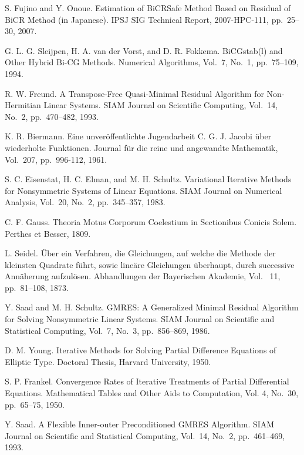 \documentclass[a4paper]{article}
\begin{document}
\begin{thebibliography}{10}
S. Fujino and Y. Onoue.
\newblock Estimation of BiCRSafe Method Based on Residual of BiCR Method (in Japanese).
\newblock IPSJ SIG Technical Report, 2007-HPC-111, pp.\ 25--30, 2007.

G. L. G. Sleijpen, H. A. van der Vorst, and D. R. Fokkema.
\newblock BiCGstab(l) and Other Hybrid Bi-CG Methods.
\newblock Numerical Algorithms, Vol.~7, No.~1, pp.\ 75--109, 1994.

R. W. Freund.
\newblock A Transpose-Free Quasi-Minimal Residual Algorithm for
	Non-Hermitian Linear Systems.
\newblock SIAM Journal on Scientific Computing, Vol.~14, No.~2, pp.\ 470--482, 1993.

K. R. Biermann.
\newblock Eine unver\"offentlichte Jugendarbeit C. G. J. Jacobi \"uber
	wiederholte Funktionen.
\newblock Journal f\"ur die reine und angewandte Mathematik, Vol.~207, pp.\ 996-112, 1961.

S. C. Eisenstat, H. C. Elman, and M. H. Schultz.
\newblock Variational Iterative Methods for Nonsymmetric Systems of
	Linear Equations.
\newblock SIAM Journal on Numerical Analysis, Vol.~20, No.~2, pp.\ 345--357, 1983.

C. F. Gauss.
\newblock Theoria Motus Corporum Coelestium in Sectionibus Conicis Solem. 
\newblock Perthes et Besser, 1809.

L. Seidel.
\newblock \"Uber ein Verfahren, die Gleichungen, auf welche die Methode
	der kleinsten Quadrate f\"uhrt, sowie line\"are Gleichungen
	\"uberhaupt, durch successive Ann\"aherung  aufzul\"osen.
\newblock Abhandlungen der Bayerischen Akademie, Vol. ~11, pp.\ 81--108,
	1873.

Y. Saad and M. H. Schultz.
\newblock GMRES: A Generalized Minimal Residual Algorithm for Solving
	Nonsymmetric Linear Systems.
\newblock SIAM Journal on Scientific and Statistical Computing, Vol.~7, No.~3, pp.\ 856--869, 1986.

D. M. Young.
\newblock Iterative Methods for Solving Partial Difference Equations of
	Elliptic Type.
\newblock Doctoral Thesis, Harvard University, 1950.

S. P. Frankel.
\newblock Convergence Rates of Iterative Treatments of Partial
	Differential Equations.
\newblock Mathematical Tables and Other Aids to Computation, Vol. 4, No.~30, 
	pp.\ 65--75, 1950.

Y. Saad.
\newblock A Flexible Inner-outer Preconditioned GMRES Algorithm.
\newblock SIAM Journal on Scientific and Statistical Computing, Vol.~14, No.~2, pp.\ 461--469, 1993.


\end{thebibliography}
\end{document}
